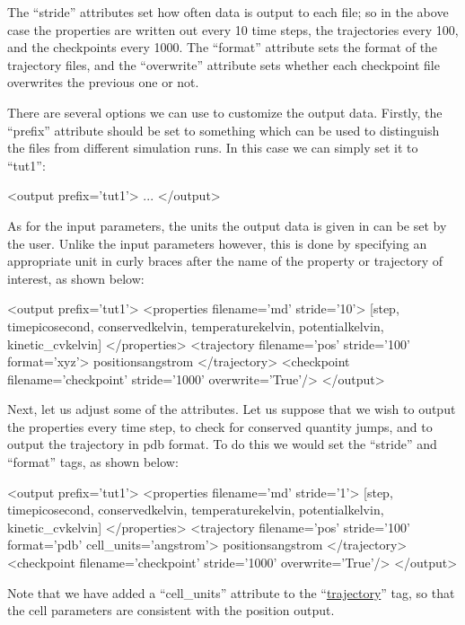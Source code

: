 \documentclass[11pt,english,fleqn]{report}
\newenvironment{code}{%
\footnotesize 
\verbatim
}{
\endverbatim
\normalsize
}
\begin{document}
The {}``stride'' attributes set how often data is output to each file;
so in the above case the properties are written out every 10 time steps,
the trajectories every 100, and the checkpoints every 1000.
The {}``format'' attribute sets the format of the trajectory files,
and the {}``overwrite'' attribute sets whether each checkpoint file 
overwrites the previous one or not.

There are several options we can use to customize the
output data. Firstly, the {}``prefix'' attribute should be set to
something which can be used to distinguish the files from different
simulation runs. In this case we can simply set it to {}``tut1'':

\begin{code}
<output prefix='tut1'>
   ...
</output>
\end{code}

As for the input parameters, the units the output data is given in can be
set by the user. Unlike the input parameters however, 
this is done by specifying an
appropriate unit in curly braces after the name of the 
property or trajectory of interest, as shown below:

\begin{code}
<output prefix='tut1'>
   <properties filename='md' stride='10'>
      [step, time{picosecond}, conserved{kelvin}, 
       temperature{kelvin}, potential{kelvin}, kinetic_cv{kelvin}] 
   </properties>
   <trajectory filename='pos' stride='100' format='xyz'>
      positions{angstrom} 
   </trajectory>
   <checkpoint filename='checkpoint' stride='1000' overwrite='True'/>
</output>
\end{code}

Next, let us adjust some of the attributes. Let us suppose that we
wish to output the properties every time step, to check for conserved
quantity jumps, and to output the trajectory in pdb format.
To do this we would set the {}``stride'' and {}``format'' tags,
as shown below:

\begin{code}
<output prefix='tut1'>
   <properties filename='md' stride='1'>
      [step, time{picosecond}, conserved{kelvin}, 
       temperature{kelvin}, potential{kelvin}, kinetic_cv{kelvin}] 
   </properties>
   <trajectory filename='pos' stride='100' format='pdb' cell_units='angstrom'>
      positions{angstrom} 
   </trajectory>
   <checkpoint filename='checkpoint' stride='1000' overwrite='True'/>
</output>
\end{code}

Note that we have added a {}``cell\_units'' attribute
to the {}``\hyperref[TRAJECTORY]{trajectory}'' tag, so that the
cell parameters are consistent with the position output.
\end{document}
